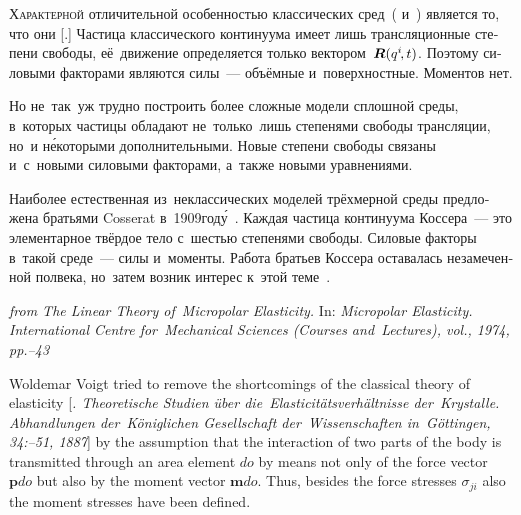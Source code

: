 \begin{otherlanguage}{russian}

\lettrine[lines=2, findent=2pt, nindent=0pt]{Х}{арактерной} отличительной особенностью классических сред~( и~) является то, что они [.] Частица классического континуума имеет лишь трансляционные степени свободы, её~движение определяется только вектором~${\bm{R}(q^i \hspace{-0.15em}, t)}$. Поэтому силовыми факторами являются силы~--- объёмные и~поверхностные. Моментов нет.

Но не~так~уж трудно построить более сложные модели сплошной среды, в~которых частицы обладают не~только~лишь степенями свободы трансляции, но~и н\'{е}которыми дополнительными. Новые степени свободы связаны и~с~новыми силовыми факторами, а~также новыми уравнениями.

Наиболее естественная из~неклассических моделей трёхмерной среды предложена братьями Cosserat в~1909\:год\'{у}~\cite{cosserat}. Каждая частица континуума Коссера~--- это элементарное твёрдое тело с~шестью степенями свободы. Силовые факторы в~такой среде~--- силы и~моменты. Работа братьев Коссера оставалась незамеченной полвека, но~затем возник интерес к~этой теме~\cite{mindlin.tiersten, nowacki-elasticity}.

\vspace{2mm}

\begin{tcolorbox}[breakable, enhanced, colback = orange!8, before upper={\parindent3.2ex}, parbox = false]
\small%
\setlength{\abovedisplayskip}{2pt}\setlength{\belowdisplayskip}{2pt}%

\noindent \textit{from  The Linear Theory of~Micropolar Elasticity.} In: \textit{Micropolar Elasticity. International Centre for~Mechanical Sciences (Courses and~Lectures), vol., 1974, pp.\hbox{--}43}

\vspace{.5em}

Woldemar Voigt tried to remove the shortcomings of the classical theory of elasticity [\textit{. Theoretische Studien über die~Elasticitätsverhältnisse der~Krystalle. Abhandlungen der~Königlichen Gesellschaft der~Wissenschaften in~Göttingen, 34:\hbox{--}51, 1887}] by the assumption that the interaction of two parts of the body is transmitted through an area element $do$ by means not only of the force vector $\bm{p}do$ but also by the moment vector $\bm{m}do$. Thus, besides the force stresses $\sigma_{ji}$ also the moment stresses have been defined.


\end{tcolorbox}
\end{otherlanguage}
